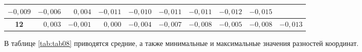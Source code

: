 \begin{table} [htbp]
{\begin{tabular}{|c|rrr|rrr|rrr|}
			\multicolumn{1}{r|}{$-0,009$}        & \multicolumn{1}{r|}{$-0,006$}       & $ 0,004$                            & \multicolumn{1}{r|}{$-0,011$}        & \multicolumn{1}{r|}{$-0,010$}       & $-0,011$                            & \multicolumn{1}{r|}{$-0,011$}        & \multicolumn{1}{r|}{$-0,012$}       & $-0,015$                            \\ \hline
			\textbf{12}                 & 
			\multicolumn{1}{r|}{$ 0,003$}        & \multicolumn{1}{r|}{$-0,001$}       & $ 0,000$                            & \multicolumn{1}{r|}{$-0,004$}        & \multicolumn{1}{r|}{$-0,007$}       & $-0,008$                            & \multicolumn{1}{r|}{$-0,005$}        & \multicolumn{1}{r|}{$-0,008$}       & $-0,013$                            \\ \hline
		\end{tabular}
	}
\end{table}


В таблице \cref{tab:tab08} приводятся средние, а также минимальные и максимальные значения разностей координат.

